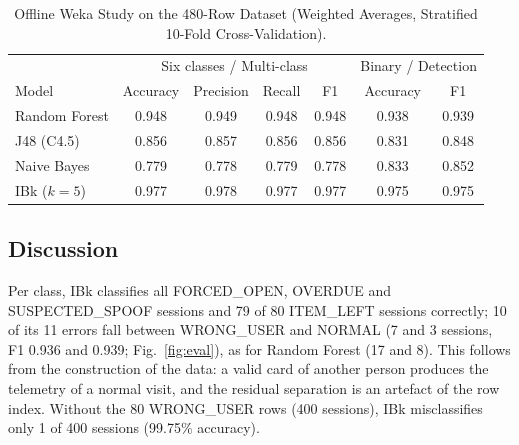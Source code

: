 \documentclass[journal,onecolumn]{IEEEtran}
\begin{document}
\begin{table}[!htbp]
\renewcommand{\arraystretch}{1.04}
\centering
\small
\caption{Offline Weka Study on the 480-Row Dataset (Weighted Averages, Stratified 10-Fold Cross-Validation).}
\label{tab:ml}
\vspace{4pt}
\begin{tabular}{l c c c c c c}
\hline
 & \multicolumn{4}{c}{Six classes / Multi-class} & \multicolumn{2}{c}{Binary / Detection} \\
Model & Accuracy & Precision & Recall & F1 & Accuracy & F1 \\
\hline
\rule{0pt}{2.6ex}Random Forest & 0.948 & 0.949 & 0.948 & 0.948 & 0.938 & 0.939 \\
J48 (C4.5)    & 0.856 & 0.857 & 0.856 & 0.856 & 0.831 & 0.848 \\
Naive Bayes   & 0.779 & 0.778 & 0.779 & 0.778 & 0.833 & 0.852 \\
IBk ($k=5$)   & 0.977 & 0.978 & 0.977 & 0.977 & 0.975 & 0.975 \\
\hline
\end{tabular}
\end{table}

\subsection{Discussion}

Per class, IBk classifies all FORCED\_OPEN, OVERDUE and SUSPECTED\_SPOOF sessions and 79 of 80 ITEM\_LEFT sessions
correctly; 10 of its 11 errors fall between WRONG\_USER and NORMAL (7 and 3 sessions, F1 0.936 and 0.939;
Fig.~\ref{fig:eval}), as for Random Forest (17 and 8). This follows from the construction of the data: a valid card of
another person produces the telemetry of a normal visit, and the residual separation is an artefact of the row index.
Without the 80 WRONG\_USER rows (400 sessions), IBk misclassifies only 1 of 400 sessions (99.75\% accuracy).
\end{document}

